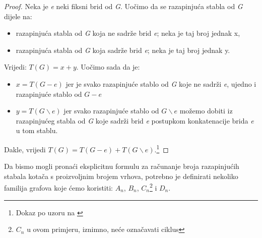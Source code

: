 \documentclass[times, utf8, zavrsni]{fer}
\begin{document}
\begin{proof}
Neka je \textit{e} neki fiksni brid od \textit{G}. Uočimo da se razapinjuća stabla od \textit{G} dijele na:
\begin{itemize}
	\item razapinjuća stabla od \textit{G} koja ne sadrže brid \textit{e}; neka je taj broj jednak x,
	\item razapinjuća stabla od \textit{G} koja sadrže brid \textit{e}; neka je taj broj jednak y.
\end{itemize}
Vrijedi: $T(G) = x + y$. Uočimo sada da je:
\begin{itemize}
	\item $x = T(G - e)$ jer je svako razapinjuće stablo od \textit{G} koje ne sadrži \textit{e}, ujedno i razapinjuće stablo od $G - e$
	\item $y = T(G \backslash e)$ jer svako razapinjuće stablo od $G \backslash e$ možemo dobiti iz razapinjućeg stabla od \textit{G} koje sadrži brid \textit{e} postupkom konkatenacije brida \textit{e} u tom stablu.
\end{itemize}
Dakle, vrijedi $T(G) = T(G - e) + T(G \backslash e)$.\footnote{Dokaz po uzoru na \cite{MM}}
\end{proof}

Da bismo mogli pronaći eksplicitnu formulu za računanje broja razapinjućih stabala kotača s proizvoljnim brojem vrhova, potrebno je definirati nekoliko familija grafova koje ćemo koristiti: $A_n$, $B_n$, $C_n$\footnote{$C_n$ u ovom primjeru, iznimno, neće označavati ciklus} i $D_n$.
\end{document}
